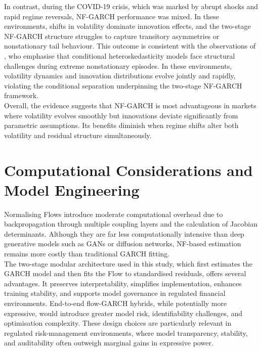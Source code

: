 \documentclass[oneside,12pt]{CUEDthesisPSnPDF}
\newcommand{\textcite}{\citet}
\begin{document}
In contrast, during the COVID-19 crisis, which was marked by abrupt shocks and rapid regime reversals, NF-GARCH performance was mixed. In these environments, shifts in volatility dominate innovation effects, and the two-stage NF-GARCH structure struggles to capture transitory asymmetries or nonstationary tail behaviour. This outcome is consistent with the observations of \textcite{engle2002dynamic}, who emphasise that conditional heteroskedasticity models face structural challenges during extreme nonstationary episodes. In these environments, volatility dynamics and innovation distributions evolve jointly and rapidly, violating the conditional separation underpinning the two-stage NF-GARCH framework.\\

Overall, the evidence suggests that NF-GARCH is most advantageous in markets where volatility evolves smoothly but innovations deviate significantly from parametric assumptions. Its benefits diminish when regime shifts alter both volatility and residual structure simultaneously.\\

\section{Computational Considerations and Model Engineering}

\noindent
Normalising Flows introduce moderate computational overhead due to backpropagation through multiple coupling layers and the calculation of Jacobian determinants. Although they are far less computationally intensive than deep generative models such as GANs or diffusion networks, NF-based estimation remains more costly than traditional GARCH fitting.\\

The two-stage modular architecture used in this study, which first estimates the GARCH model and then fits the Flow to standardised residuals, offers several advantages. It preserves interpretability, simplifies implementation, enhances training stability, and supports model governance in regulated financial environments. End-to-end flow-GARCH hybrids, while potentially more expressive, would introduce greater model risk, identifiability challenges, and optimisation complexity. These design choices are particularly relevant in regulated risk-management environments, where model transparency, stability, and auditability often outweigh marginal gains in expressive power.\\
\end{document}
